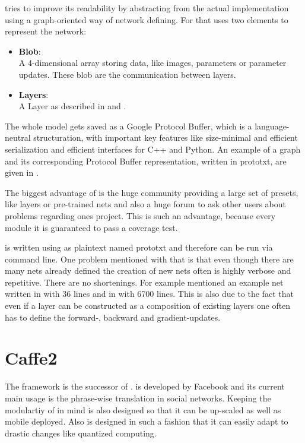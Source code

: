 \caffe tries to improve its readability by abstracting from the actual implementation using a graph-oriented way of network defining. For that \caffe uses two elements to represent the network:
\begin{itemize}
	\item \textbf{Blob}:\\
		A 4-dimensional array storing data, like images, parameters or parameter updates. These blob are the communication between layers.
	\item \textbf{Layers}:\\
		A Layer as described in  and .
\end{itemize}
The whole model gets saved as a Google Protocol Buffer, which is a language-neutral structuration, with important key features like size-minimal and efficient serialization and efficient interfaces for C++ and Python. \cite{jia2014caffe} \cite{varda2008protocol}
An example of a graph and its corresponding Protocol Buffer representation, written in prototxt, are given in .



The biggest advantage of \caffe is the huge community providing a large set of presets, like layers or pre-trained nets and also a huge forum to ask other users about problems regarding ones project. This is such an advantage, because every module it is  guaranteed to pass a coverage test. \cite{jia2014caffe}

\caffe is written using as plaintext named prototxt and therefore can be run via command line. One problem mentioned with that is that even though there are many nets already defined the creation of new nets often is highly verbose and repetitive. There are no shortenings. For example \cite{tim2018CNNArchLang} mentioned an example net written in \cnnarch with 36 lines and in \caffe with 6700 lines. This is also due to the fact that even if a layer can be constructed as a composition of existing layers one often has to define the forward-, backward and gradient-updates. %

\section{Caffe2} \label{sec: Caffe2}
The framework \caffetwo is the successor of \caffe. \caffetwo is developed by Facebook and its current main usage is the phrase-wise translation in social networks. Keeping the modulartiy of \caffe in mind \caffetwo is also designed so that it can be up-scaled as well as mobile deployed. Also \caffetwo is designed in such a fashion that it can easily adapt to drastic changes like quantized computing. \cite{Caffe2Homepage}

